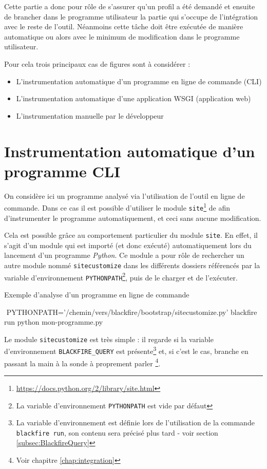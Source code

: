 Cette partie a donc pour rôle de s'assurer qu'un profil a été demandé et ensuite de brancher dans le \gls{programme utilisateur} la partie qui s'occupe de l'intégration avec le reste de l'outil. Néanmoins cette tâche doit être exécutée de manière automatique ou alors avec le minimum de modification dans le programme utilisateur.

Pour cela trois principaux cas de figures sont à considérer :
\begin{itemize}
\item L'instrumentation automatique d'un programme en ligne de commande (\gls{CLI})
\item L'instrumentation automatique d'une application \gls{WSGI} (application web)
\item L'instrumentation manuelle par le développeur
\end{itemize}

\section[Programme CLI]{Instrumentation automatique d'un programme CLI}
\label{sec:instru-pythonpath}
On considère ici un programme analysé via l'utilisation de l'outil en ligne de commande. Dans ce cas il est possible d'utiliser le module \verb|site|\footnote{\url{https://docs.python.org/2/library/site.html}} de \Python afin d'instrumenter le programme automatiquement, et ceci sans aucune modification.

Cela est possible grâce au comportement particulier du module \verb|site|. En effet, il s'agit d'un module qui est importé (et donc exécuté) automatiquement lors du lancement d'un programme \emph{Python}. Ce module a pour rôle de rechercher un autre module nommé \verb|sitecustomize| dans les différents dossiers référencés par la variable d'environnement \verb|PYTHONPATH|\footnote{La variable d'environnement \verb?PYTHONPATH? est vide par défaut}, puis de le charger et de l'exécuter.

\begin{listing}[H]
\caption{Exemple d'analyse d'un programme en ligne de commande}
\begin{bashcode}
 $ $ PYTHONPATH='/chemin/vers/blackfire/bootstrap/sitecustomize.py' blackfire run python mon-programme.py
\end{bashcode}
\end{listing}

Le module \verb|sitecustomize| est très simple : il regarde si la variable d'environnement \verb|BLACKFIRE_QUERY| est présente\footnote{La variable d'environnement est définie lors de l'utilisation de la commande \verb?blackfire run?, son contenu sera précisé plus tard - voir section \vref{subsec:BlackfireQuery}} et, si c'est le cas, branche \Blackfire en passant la main à la sonde à proprement parler \footnote{Voir chapitre \vref{chap:integration}}.


